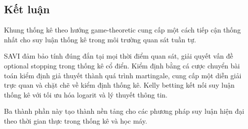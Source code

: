 \subsection{Kết luận}

Khung thống kê theo hướng game-theoretic cung cấp một cách tiếp cận thống nhất cho suy luận thống kê trong môi trường quan sát tuần tự.

SAVI đảm bảo tính đúng đắn tại mọi thời điểm quan sát, giải quyết vấn đề optional stopping trong thống kê cổ điển. Kiểm định bằng cá cược chuyển bài toán kiểm định giả thuyết thành quá trình martingale, cung cấp một diễn giải trực quan và chặt chẽ về kiểm định thống kê. Kelly betting kết nối suy luận thống kê với tối ưu hóa logarit và lý thuyết thông tin.

Ba thành phần này tạo thành nền tảng cho các phương pháp suy luận hiện đại theo thời gian thực trong thống kê và học máy.